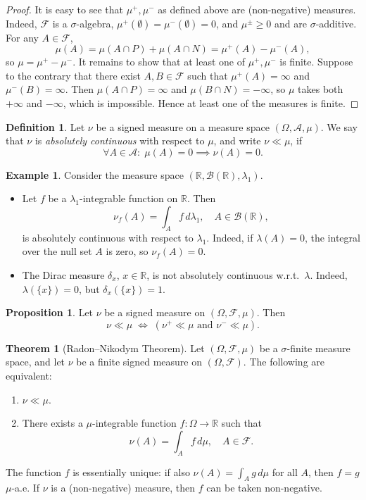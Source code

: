 \documentclass[11pt,a4paper]{article}
\theoremstyle{definition}
\newtheorem{definition}{Definition}[section]
\newtheorem{theorem}{Theorem}[section]
\newtheorem{example}{Example}[section]
\newtheorem{proposition}{Proposition}[section]
\begin{document}
\begin{proof}
It is easy to see that $\mu^+,\mu^-$ as defined above are (non-negative) measures.  Indeed, $\mathcal{F}$ is a $\sigma$-algebra, $\mu^+(\emptyset)=\mu^-(\emptyset)=0$, and $\mu^\pm\ge0$ and are $\sigma$-additive.  For any $A\in\mathcal{F}$,
\[
\mu(A) = \mu(A\cap P) + \mu(A\cap N) = \mu^+(A) - \mu^-(A),
\]
so $\mu=\mu^+ - \mu^-$.  It remains to show that at least one of $\mu^+,\mu^-$ is finite.  Suppose to the contrary that there exist $A,B\in\mathcal{F}$ such that $\mu^+(A)=\infty$ and $\mu^-(B)=\infty$.  Then $\mu(A\cap P)=\infty$ and $\mu(B\cap N)=-\infty$, so $\mu$ takes both $+\infty$ and $-\infty$, which is impossible.  Hence at least one of the measures is finite.
\end{proof}

\begin{definition}
Let $\nu$ be a signed measure on a measure space $(\Omega,\mathcal{A},\mu)$.  We say that $\nu$ is \emph{absolutely continuous} with respect to $\mu$, and write $\nu\ll\mu$, if
\[
\forall A\in\mathcal{A}\colon\;\mu(A)=0 \implies \nu(A)=0.
\]
\end{definition}

\begin{example}
Consider the measure space $(\mathbb{R},\mathcal{B}(\mathbb{R}),\lambda_1)$.
\begin{itemize}
\item[(a)] Let $f$ be a $\lambda_1$-integrable function on $\mathbb{R}$.  Then 
\[
\nu_f(A) = \int_A f\,d\lambda_1,\quad A\in\mathcal{B}(\mathbb{R}),
\]
is absolutely continuous with respect to $\lambda_1$.  Indeed, if $\lambda(A)=0$, the integral over the null set $A$ is zero, so $\nu_f(A)=0$.
\item[(b)] The Dirac measure $\delta_x$, $x\in\mathbb{R}$, is not absolutely continuous w.r.t.\ $\lambda$.  Indeed, $\lambda(\{x\})=0$, but $\delta_x(\{x\})=1$.
\end{itemize}
\end{example}

\begin{proposition}
Let $\nu$ be a signed measure on $(\Omega,\mathcal{F},\mu)$.  Then 
\[
\nu \ll \mu \;\iff\; (\nu^+ \ll \mu \text{ and } \nu^- \ll \mu).
\]
\end{proposition}


\begin{theorem}[Radon--Nikodym Theorem]
Let $(\Omega,\mathcal{F},\mu)$ be a $\sigma$-finite measure space, and let $\nu$ be a finite signed measure on $(\Omega,\mathcal{F})$.  The following are equivalent:
\begin{enumerate}
\item $\nu \ll \mu$.
\item There exists a $\mu$-integrable function $f\colon \Omega\to \mathbb{R}$ such that
\[
\nu(A) = \int_A f\,d\mu,\quad A\in\mathcal{F}.
\]
\end{enumerate}
The function $f$ is essentially unique: if also $\nu(A)=\int_A g\,d\mu$ for all $A$, then $f=g$ $\mu$-a.e.  If $\nu$ is a (non-negative) measure, then $f$ can be taken non-negative.
\end{theorem}
\end{document}
